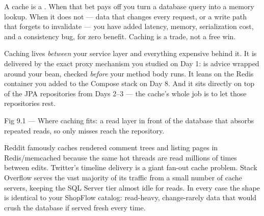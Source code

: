 \begin{keyidea}
A cache is a . When that bet pays off you turn a database query into a memory lookup. When it does not --- data that changes every request, or a write path that forgets to invalidate --- you have added latency, memory, serialization cost, and a consistency bug, for zero benefit. Caching is a trade, not a free win.
\end{keyidea}

 Caching lives \emph{between} your service layer and everything expensive behind it. It is delivered by the exact proxy mechanism you studied on Day 1:  is advice wrapped around your bean, checked \emph{before} your method body runs. It leans on the Redis container you added to the Compose stack on Day 8. And it sits directly on top of the JPA repositories from Days 2--3 --- the cache's whole job is to let those repositories rest.

\begin{wbfigure}{Fig 9.1 --- Where caching fits: a read layer in front of the database that absorbs repeated reads, so only misses reach the repository.}
\end{wbfigure}

 Reddit famously caches rendered comment trees and listing pages in Redis/memcached because the same hot threads are read millions of times between edits. Twitter's timeline delivery is a giant fan-out cache problem. Stack Overflow serves the vast majority of its traffic from a small number of cache servers, keeping the SQL Server tier almost idle for reads. In every case the shape is identical to your ShopFlow catalog: read-heavy, change-rarely data that would crush the database if served fresh every time.

